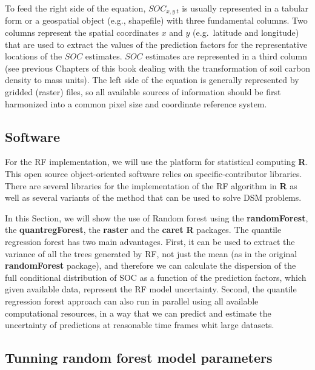 \documentclass[10pt,b5paper,]{book}
\theoremstyle{definition}
\theoremstyle{definition}
\theoremstyle{definition}
\theoremstyle{remark}
\begin{document}
To feed the right side of the equation, \(SOC_{x,y~t}\) is usually
represented in a tabular form or a geospatial object (e.g., shapefile)
with three fundamental columns. Two columns represent the spatial
coordinates \(x\) and \(y\) (e.g.~latitude and longitude) that are used
to extract the values of the prediction factors for the representative
locations of the \(SOC\) estimates. \(SOC\) estimates are represented in
a third column (see previous Chapters of this book dealing with the
transformation of soil carbon density to mass units). The left side of
the equation is generally represented by gridded (raster) files, so all
available sources of information should be first harmonized into a
common pixel size and coordinate reference system.

\hypertarget{software}{%
\subsection{Software}\label{software}}

For the RF implementation, we will use the platform for statistical
computing \textbf{R}. This open source object-oriented software relies
on specific-contributor libraries. There are several libraries for the
implementation of the RF algorithm in \textbf{R} as well as several
variants of the method that can be used to solve DSM problems.

In this Section, we will show the use of Random forest using the
\textbf{randomForest}, the \textbf{quantregForest}, the \textbf{raster}
and the \textbf{caret} \textbf{R} packages. The quantile regression
forest \citep[\textbf{quantregForest};][]{meinshausen2006quantile} has
two main advantages. First, it can be used to extract the variance of
all the trees generated by RF, not just the mean (as in the original
\textbf{randomForest} package), and therefore we can calculate the
dispersion of the full conditional distribution of SOC as a function of
the prediction factors, which given available data, represent the RF
model uncertainty. Second, the quantile regression forest approach can
also run in parallel using all available computational resources, in a
way that we can predict and estimate the uncertainty of predictions at
reasonable time frames whit large datasets.

\hypertarget{tunning-random-forest-model-parameters}{%
\subsection{Tunning random forest model
parameters}\label{tunning-random-forest-model-parameters}}
\end{document}
